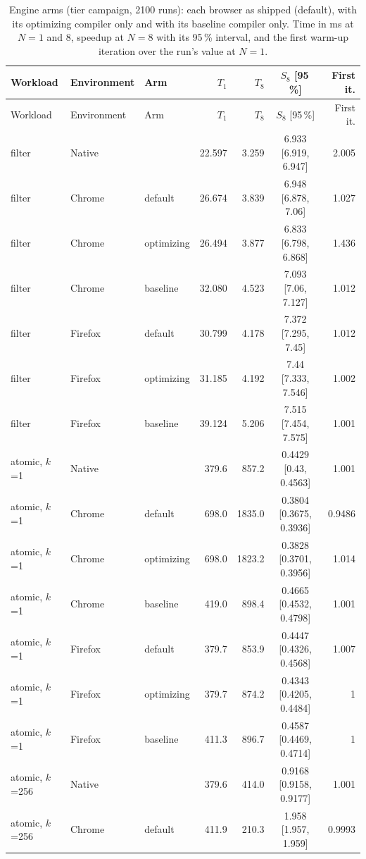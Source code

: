 {\small
\begin{longtable}{lllrrcr}
\caption{Engine arms (tier campaign, 2100 runs): each browser as shipped (default), with its optimizing compiler only and with its baseline compiler only. Time in ms at $N=1$ and 8, speedup at $N=8$ with its 95\,\% interval, and the first warm-up iteration over the run's value at $N=1$.}\label{tab:tier} \\
\toprule
Workload & Environment & Arm & $T_1$ & $T_8$ & $S_8$ [95\,\%] & First it. \\
\midrule
\endfirsthead
\toprule
Workload & Environment & Arm & $T_1$ & $T_8$ & $S_8$ [95\,\%] & First it. \\
\midrule
\endhead
\bottomrule
\endfoot
filter & Native &  & 22.597 & 3.259 & 6.933 [6.919, 6.947] & 2.005 \\
filter & Chrome & default & 26.674 & 3.839 & 6.948 [6.878, 7.06] & 1.027 \\
filter & Chrome & optimizing & 26.494 & 3.877 & 6.833 [6.798, 6.868] & 1.436 \\
filter & Chrome & baseline & 32.080 & 4.523 & 7.093 [7.06, 7.127] & 1.012 \\
filter & Firefox & default & 30.799 & 4.178 & 7.372 [7.295, 7.45] & 1.012 \\
filter & Firefox & optimizing & 31.185 & 4.192 & 7.44 [7.333, 7.546] & 1.002 \\
filter & Firefox & baseline & 39.124 & 5.206 & 7.515 [7.454, 7.575] & 1.001 \\
\midrule
atomic, $k$=1 & Native &  & 379.6 & 857.2 & 0.4429 [0.43, 0.4563] & 1.001 \\
atomic, $k$=1 & Chrome & default & 698.0 & 1835.0 & 0.3804 [0.3675, 0.3936] & 0.9486 \\
atomic, $k$=1 & Chrome & optimizing & 698.0 & 1823.2 & 0.3828 [0.3701, 0.3956] & 1.014 \\
atomic, $k$=1 & Chrome & baseline & 419.0 & 898.4 & 0.4665 [0.4532, 0.4798] & 1.001 \\
atomic, $k$=1 & Firefox & default & 379.7 & 853.9 & 0.4447 [0.4326, 0.4568] & 1.007 \\
atomic, $k$=1 & Firefox & optimizing & 379.7 & 874.2 & 0.4343 [0.4205, 0.4484] & 1 \\
atomic, $k$=1 & Firefox & baseline & 411.3 & 896.7 & 0.4587 [0.4469, 0.4714] & 1 \\
\midrule
atomic, $k$=256 & Native &  & 379.6 & 414.0 & 0.9168 [0.9158, 0.9177] & 1.001 \\
atomic, $k$=256 & Chrome & default & 411.9 & 210.3 & 1.958 [1.957, 1.959] & 0.9993 \\

\end{longtable}}
